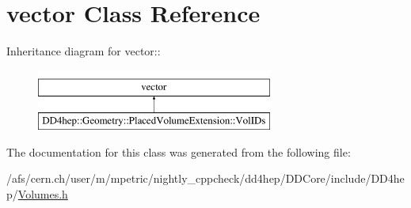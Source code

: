 \hypertarget{classstd_1_1vector}{
\section{vector Class Reference}
\label{classstd_1_1vector}
}
Inheritance diagram for vector::\begin{figure}[H]
\begin{center}
\leavevmode
\includegraphics[height=2cm]{classstd_1_1vector}
\end{center}
\end{figure}


The documentation for this class was generated from the following file:\begin{DoxyCompactItemize}
\item 
/afs/cern.ch/user/m/mpetric/nightly\_\-cppcheck/dd4hep/DDCore/include/DD4hep/\hyperlink{_volumes_8h}{Volumes.h}\end{DoxyCompactItemize}
